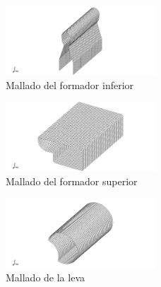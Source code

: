 \begin{figure}[H]
\centering
\includegraphics[width=0.5\textwidth]{src/ch3/mesh_fi.png}
\caption{Mallado del formador inferior}
\label{fig:mesh_fi}
\end{figure}

\begin{figure}[H]
\centering
\includegraphics[width=0.5\textwidth]{src/ch3/mesh_fs.png}
\caption{Mallado del formador superior}
\label{fig:mesh_fi}
\end{figure}

\begin{figure}[H]
\centering
\includegraphics[width=0.5\textwidth]{src/ch3/mesh_leva.png}
\caption{Mallado de la leva}
\label{fig:mesh_fi}
\end{figure}



